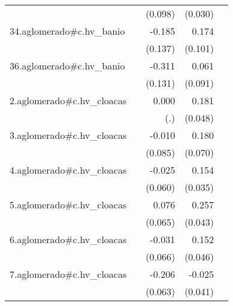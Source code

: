 {\begin{longtable}{l*{4}{D{.}{.}{-1}}}
            &                     &     (0.098)         &     (0.030)         &                     \\
\addlinespace
34.aglomerado#c.hv\_banio&                     &      -0.185         &       0.174         &                     \\
            &                     &     (0.137)         &     (0.101)         &                     \\
\addlinespace
36.aglomerado#c.hv\_banio&                     &      -0.311\sym{*}  &       0.061         &                     \\
            &                     &     (0.131)         &     (0.091)         &                     \\
\addlinespace
2.aglomerado#c.hv\_cloacas&                     &       0.000         &       0.181\sym{***}&                     \\
            &                     &         (.)         &     (0.048)         &                     \\
\addlinespace
3.aglomerado#c.hv\_cloacas&                     &      -0.010         &       0.180\sym{**} &                     \\
            &                     &     (0.085)         &     (0.070)         &                     \\
\addlinespace
4.aglomerado#c.hv\_cloacas&                     &      -0.025         &       0.154\sym{***}&                     \\
            &                     &     (0.060)         &     (0.035)         &                     \\
\addlinespace
5.aglomerado#c.hv\_cloacas&                     &       0.076         &       0.257\sym{***}&                     \\
            &                     &     (0.065)         &     (0.043)         &                     \\
\addlinespace
6.aglomerado#c.hv\_cloacas&                     &      -0.031         &       0.152\sym{***}&                     \\
            &                     &     (0.066)         &     (0.046)         &                     \\
\addlinespace
7.aglomerado#c.hv\_cloacas&                     &      -0.206\sym{***}&      -0.025         &                     \\
            &                     &     (0.063)         &     (0.041)         &                     \\

\end{longtable}}
